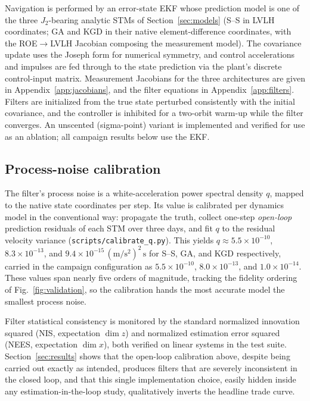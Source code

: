 Navigation is performed by an error-state EKF whose prediction model is one
of the three $J_2$-bearing analytic STMs of Section~\ref{sec:models}
(S--S in LVLH coordinates; GA and KGD in their native element-difference
coordinates, with the ROE$\to$LVLH Jacobian composing the measurement
model). The covariance update uses the Joseph form for numerical symmetry,
and control accelerations and impulses are fed through to the state
prediction via the plant's discrete control-input matrix. Measurement
Jacobians for the three architectures are given in
Appendix~\ref{app:jacobians}, and the filter equations in
Appendix~\ref{app:filters}. Filters are initialized from the true state
perturbed consistently with the initial covariance, and the controller is
inhibited for a two-orbit warm-up while the filter converges. An unscented
(sigma-point) variant is implemented and verified for use as an ablation;
all campaign results below use the EKF.

\subsection{Process-noise calibration}

The filter's process noise is a white-acceleration power spectral density
$q$, mapped to the native state coordinates per step. Its value is
calibrated per dynamics model in the conventional way: propagate the truth,
collect one-step \emph{open-loop} prediction residuals of each STM over
three days, and fit $q$ to the residual velocity variance
(\texttt{scripts/calibrate\_q.py}). This yields
$q \approx 5.5\times10^{-10}$, $8.3\times10^{-13}$, and
$9.4\times10^{-15}\,(\mathrm{m/s^2})^2\,\mathrm{s}$ for S--S, GA, and KGD
respectively, carried in the campaign configuration as
$5.5\times10^{-10}$, $8.0\times10^{-13}$, and $1.0\times10^{-14}$. These
values span nearly five orders of magnitude, tracking the fidelity ordering
of Fig.~\ref{fig:validation}, so the calibration hands the most accurate
model the smallest process noise.

Filter statistical consistency is monitored by the standard normalized
innovation squared (NIS, expectation $\dim z$) and normalized estimation
error squared (NEES, expectation $\dim x$), both verified on linear
systems in the test suite. Section~\ref{sec:results} shows that the
open-loop calibration above, despite being carried out exactly as intended,
produces filters that are severely inconsistent in the closed loop, and
that this single implementation choice, easily hidden inside any
estimation-in-the-loop study, qualitatively inverts the headline trade
curve.
